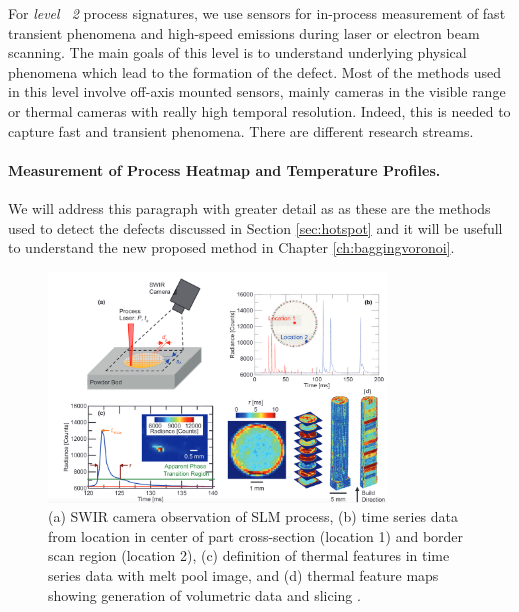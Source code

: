 For \emph{level ~2} process signatures, we use sensors for in-process measurement of fast transient phenomena and high-speed emissions during laser or electron beam scanning. The main goals of this level is to understand underlying physical phenomena which lead to the formation of the defect. Most of the methods used in this level involve off-axis mounted sensors, mainly cameras in the visible range or thermal cameras with really high temporal resolution. Indeed, this is needed to capture fast and transient phenomena. There are different research streams.



\paragraph{Measurement of Process Heatmap and Temperature Profiles.} We will address this paragraph with greater detail as as these are the methods used to detect the defects discussed in Section \ref{sec:hotspot} and it will be usefull to understand the new proposed method in Chapter \ref{ch:baggingvoronoi}. 
\begin{figure}
    \centering
    \includegraphics[width=0.8\textwidth]{Images/voxel.png}
    \caption[Example of voxel thermic reconstruction.]{(a) SWIR camera observation of SLM process, (b) time series data from location in center of part cross-section (location 1) and border scan region (location 2), (c) definition of thermal features in time series data with melt pool image, and (d) thermal feature maps showing generation of volumetric data and slicing \cite{lough_-situ_2019}.}
    \label{fig:voxel}
\end{figure}
